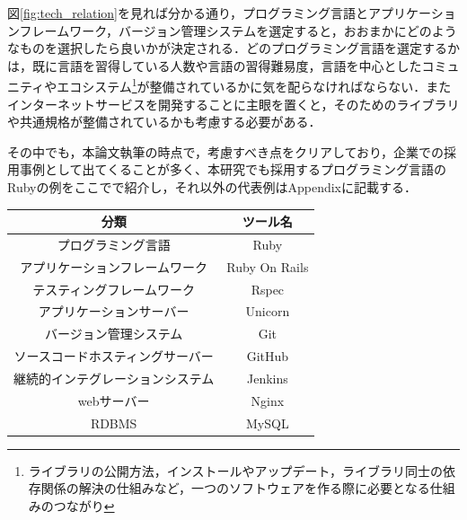 図\ref{fig:tech_relation}を見れば分かる通り，プログラミング言語とアプリケーションフレームワーク，バージョン管理システムを選定すると，おおまかにどのようなものを選択したら良いかが決定される．どのプログラミング言語を選定するかは，既に言語を習得している人数や言語の習得難易度，言語を中心としたコミュニティやエコシステム\footnote{ライブラリの公開方法，インストールやアップデート，ライブラリ同士の依存関係の解決の仕組みなど，一つのソフトウェアを作る際に必要となる仕組みのつながり}が整備されているかに気を配らなければならない．またインターネットサービスを開発することに主眼を置くと，そのためのライブラリや共通規格が整備されているかも考慮する必要がある．

その中でも，本論文執筆の時点で，考慮すべき点をクリアしており，企業での採用事例として出てくることが多く、本研究でも採用するプログラミング言語のRubyの例をここでで紹介し，それ以外の代表例はAppendixに記載する．

\begin{table}[ht]
  \begin{center}
    \begin{tabular}{|c|c|}
      \hline
      分類 & ツール名 \\
      \hline
      プログラミング言語 & Ruby \\
      \hline
      アプリケーションフレームワーク& Ruby On Rails\\
      \hline
      テスティングフレームワーク & Rspec \\
      \hline
      アプリケーションサーバー & Unicorn \\
      \hline
      バージョン管理システム & Git \\
      \hline
      ソースコードホスティングサーバー & GitHub \\
      \hline
      継続的インテグレーションシステム & Jenkins \\
      \hline
      webサーバー & Nginx \\
      \hline
      RDBMS & MySQL \\
      \hline
    \end{tabular}
  \end{center}
\end{table}
